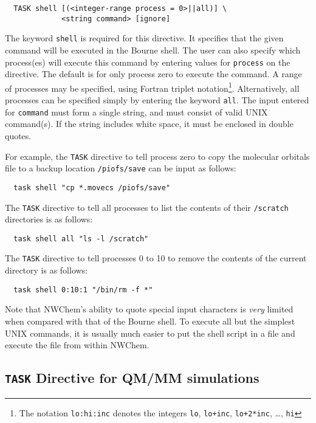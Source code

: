 \begin{verbatim}
  TASK shell [(<integer-range process = 0>||all)] \
             <string command> [ignore]
\end{verbatim}

The keyword \verb+shell+ is required for this directive.  It specifies
that the given command will be executed in the Bourne shell.  The user
can also specify which process(es) will execute this command by
entering values for \verb+process+ on the directive.  The default is
for only process zero to execute the command.  A range of processes
may be specified, using Fortran triplet notation\footnote{The notation
  \verb+lo:hi:inc+ denotes the integers \verb+lo+, \verb=lo+inc=,
  \verb=lo+2*inc=, \ldots, \verb+hi+}.  Alternatively, all
processes can be specified simply by entering the keyword \verb+all+.
The input entered for \verb+command+ must form a single string, and
must consist of valid UNIX command(s).  If the string includes white space,
it must be enclosed in double quotes.

For example, the \verb+TASK+ directive to tell process zero to copy the 
molecular orbitals file to a backup location \verb+/piofs/save+ can be input as follows:

\begin{verbatim}
  task shell "cp *.movecs /piofs/save"
\end{verbatim}

The \verb+TASK+ directive to tell all processes to list the contents of 
their \verb+/scratch+ directories is as follows:

\begin{verbatim}
  task shell all "ls -l /scratch"
\end{verbatim}

The \verb+TASK+ directive to tell processes 0 to 10 to remove the 
contents of the current directory is as follows:

\begin{verbatim}
  task shell 0:10:1 "/bin/rm -f *"
\end{verbatim}

Note that NWChem's ability to quote special input characters is {\em
  very} limited when compared with that of the Bourne shell.  To
execute all but the simplest UNIX commands, it is usually much easier
to put the shell script in a file and execute the file from within
NWChem.

\subsection{{\tt TASK} Directive for QM/MM simulations}

